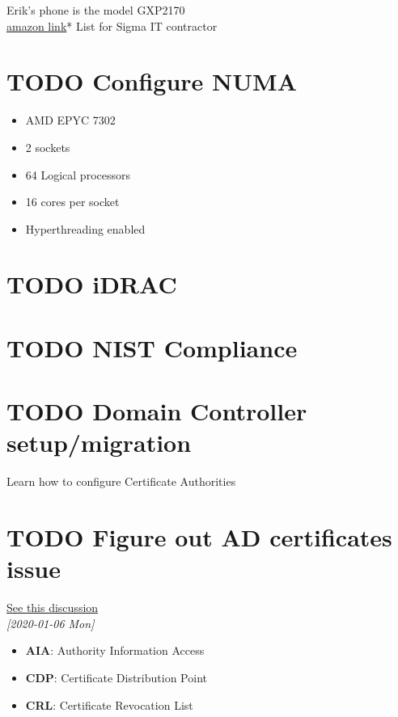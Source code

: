 \documentclass[11pt]{article}
\begin{document}
Erik's phone is the model GXP2170\\
\href{https://www.amazon.com/Grandstream-GS-GXP2170-VoIP-Phone-Device/dp/B019X06IFS/ref=sr\_1\_1?keywords=gpx+2170\&qid=1578338057\&sr=8-1}{amazon link}* List for Sigma IT contractor\\
\section*{{\bfseries\sffamily TODO}  Configure NUMA}
\label{sec:org3f32b04}
\begin{itemize}
\item AMD EPYC 7302\\
\item 2 sockets\\
\item 64 Logical processors\\
\item 16 cores per socket\\
\item Hyperthreading enabled\\
\end{itemize}
\section*{{\bfseries\sffamily TODO}  iDRAC}
\label{sec:org56838b5}
\section*{{\bfseries\sffamily TODO}  NIST Compliance}
\label{sec:org8c90a1a}
\section*{{\bfseries\sffamily TODO}  Domain Controller setup/migration}
\label{sec:orgb638d13}
Learn how to configure Certificate Authorities\\
\section*{{\bfseries\sffamily TODO}  Figure out AD certificates issue}
\label{sec:orgef413dc}
\href{https://social.technet.microsoft.com/Forums/windowsserver/en-US/e150a463-7826-4151-9623-a6e655b6540e/issuing-cas-crl-checking-not-working?forum=winserversecurity}{See this discussion}\\

\textit{[2020-01-06 Mon]}\\
\begin{itemize}
\item \textbf{AIA}: Authority Information Access\\
\item \textbf{CDP}: Certificate Distribution Point\\
\item \textbf{CRL}: Certificate Revocation List\\
\end{itemize}
\end{document}
